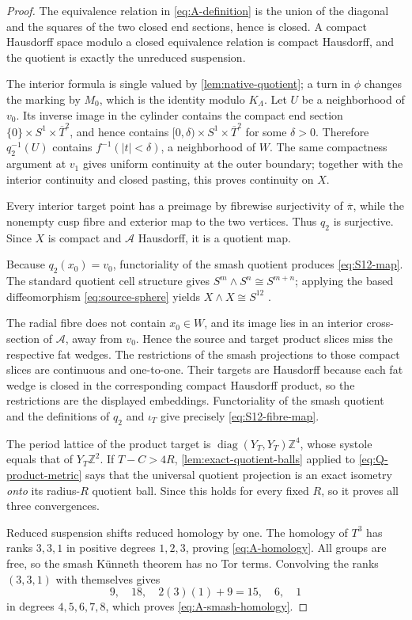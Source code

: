 \documentclass[11pt,letterpaper]{article}
\numberwithin{equation}{section}
\theoremstyle{definition}
\theoremstyle{remark}
\newcommand{\Z}{\mathbb Z}
\begin{document}
\begin{proof}
The equivalence relation in \cref{eq:A-definition} is the union of the
diagonal and the squares of the two closed end sections, hence is closed.
A compact Hausdorff space modulo a closed equivalence relation is compact
Hausdorff, and the quotient is exactly the unreduced suspension.

The interior formula is single valued by \cref{lem:native-quotient}; a
turn in $\phi$ changes the marking by $M_0$, which is the identity modulo
$K_\Lambda$.  Let $U$ be a neighborhood of $v_0$.  Its inverse image in
the cylinder contains the compact end section
$\{0\}\times S^1\times\overline T^2$, and hence contains
$[0,\delta)\times S^1\times\overline T^2$ for some $\delta>0$.
Therefore $q_2^{-1}(U)$ contains $f^{-1}(|t|<\delta)$, a neighborhood of
$W$.  The same compactness argument at $v_1$ gives uniform continuity at
the outer boundary; together with the interior continuity and closed
pasting, this proves continuity on $X$.

Every interior target point has a preimage by fibrewise surjectivity of
$\overline\pi$, while the nonempty cusp fibre and exterior map to the two
vertices.  Thus $q_2$ is surjective.  Since $X$ is compact and
$\mathcal A$ Hausdorff, it is a quotient map.

Because $q_2(x_0)=v_0$, functoriality of the smash quotient produces
\cref{eq:S12-map}.  The standard quotient cell structure gives
$S^m\wedge S^n\cong S^{m+n}$; applying the based diffeomorphism
\cref{eq:source-sphere} yields $X\wedge X\cong S^{12}$
\citep[Chapter~0, Smash Products]{Hatcher2002}.

The radial fibre does not contain $x_0\in W$, and its image lies in an
interior cross-section of $\mathcal A$, away from $v_0$.  Hence the source
and target product slices miss the respective fat wedges.  The restrictions
of the smash projections to those compact slices are continuous and
one-to-one.  Their targets are Hausdorff because each fat wedge is closed
in the corresponding compact Hausdorff product, so the restrictions are
the displayed embeddings.  Functoriality of the smash quotient and the
definitions of $q_2$ and $\iota_T$ give precisely
\cref{eq:S12-fibre-map}.

The period lattice of the product target is
$\operatorname{diag}(Y_T,Y_T)\Z^4$, whose systole equals that of
$Y_T\Z^2$.  If $T-C>4R$, \cref{lem:exact-quotient-balls} applied to
\cref{eq:Q-product-metric} says that the universal quotient projection is
an exact isometry \emph{onto} its radius-$R$ quotient ball.  Since this
holds for every fixed \(R\), so it proves all three convergences.

Reduced suspension shifts reduced homology by one.  The homology of $T^3$
has ranks $3,3,1$ in positive degrees $1,2,3$, proving
\cref{eq:A-homology}.  All groups are free, so the smash K\"unneth theorem
has no Tor terms.  Convolving the ranks $(3,3,1)$ with themselves gives
\[
 9,\quad18,\quad 2(3)(1)+9=15,\quad6,\quad1
\]
in degrees $4,5,6,7,8$, which proves \cref{eq:A-smash-homology}.
\end{proof}
\end{document}
